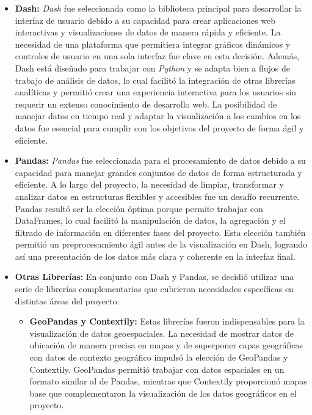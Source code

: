 \begin{itemize}
    \item \textbf{Dash:} \textit{Dash} fue seleccionada como la biblioteca principal para desarrollar la interfaz de usuario debido a su capacidad para crear aplicaciones web interactivas y visualizaciones de datos de manera rápida y eficiente. La necesidad de una plataforma que permitiera integrar gráficos dinámicos y controles de usuario en una sola interfaz fue clave en esta decisión. Además, Dash está diseñado para trabajar con \textit{Python} y se adapta bien a flujos de trabajo de análisis de datos, lo cual facilitó la integración de otras librerías analíticas y permitió crear una experiencia interactiva para los usuarios sin requerir un extenso conocimiento de desarrollo web. La posibilidad de manejar datos en tiempo real y adaptar la visualización a los cambios en los datos fue esencial para cumplir con los objetivos del proyecto de forma ágil y eficiente.

    \item \textbf{Pandas:} \textit{Pandas} fue seleccionada para el procesamiento de datos debido a su capacidad para manejar grandes conjuntos de datos de forma estructurada y eficiente. A lo largo del proyecto, la necesidad de limpiar, transformar y analizar datos en estructuras flexibles y accesibles fue un desafío recurrente. Pandas resultó ser la elección óptima porque permite trabajar con DataFrames, lo cual facilitó la manipulación de datos, la agregación y el filtrado de información en diferentes fases del proyecto. Esta elección también permitió un preprocesamiento ágil antes de la visualización en Dash, logrando así una presentación de los datos más clara y coherente en la interfaz final.

    \item \textbf{Otras Librerías:} En conjunto con Dash y Pandas, se decidió utilizar una serie de librerías complementarias que cubrieron necesidades específicas en distintas áreas del proyecto:
    \begin{itemize}
        \item \textbf{GeoPandas y Contextily:} Estas librerías fueron indispensables para la visualización de datos geoespaciales. La necesidad de mostrar datos de ubicación de manera precisa en mapas y de superponer capas geográficas con datos de contexto geográfico impulsó la elección de GeoPandas y Contextily. GeoPandas permitió trabajar con datos espaciales en un formato similar al de Pandas, mientras que Contextily proporcionó mapas base que complementaron la visualización de los datos geográficos en el proyecto.


\end{itemize}
\end{itemize}
